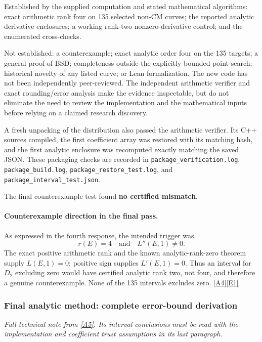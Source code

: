 \documentclass[11pt]{article}
\newcommand{\srcref}[1]{\hyperlink{source:#1}{[#1]}}
\begin{document}
Established by the supplied computation and stated mathematical algorithms: exact arithmetic rank four on 135 selected non-CM curves; the reported analytic derivative enclosures; a working rank-two nonzero-derivative control; and the enumerated cross-checks.

Not established: a counterexample; exact analytic order four on the 135 targets; a general proof of BSD; completeness outside the explicitly bounded point search; historical novelty of any listed curve; or Lean formalization. The new code has not been independently peer-reviewed. The independent arithmetic verifier and exact rounding/error analysis make the evidence inspectable, but do not eliminate the need to review the implementation and the mathematical inputs before relying on a claimed research discovery.

A fresh unpacking of the distribution also passed the arithmetic verifier. Its C++ sources compiled, the first coefficient array was restored with its matching hash, and the first analytic enclosure was recomputed exactly matching the saved JSON. These packaging checks are recorded in \nolinkurl{package_verification.log}, \nolinkurl{package_build.log}, \nolinkurl{package_restore_test.log}, and \nolinkurl{package_interval_test.json}.

The final counterexample test found \textbf{no certified mismatch}.

\paragraph{Counterexample direction in the final pass.}
As expressed in the fourth response, the intended trigger was
\[
 \boxed{r(E)=4\quad\text{and}\quad L''(E,1)\ne0.}
\]
The exact positive arithmetic rank and the known analytic-rank-zero theorem
supply $L(E,1)=0$; positive sign supplies $L'(E,1)=0$. Thus an interval for $D_2$
excluding zero would have certified analytic rank two, not four, and therefore
a genuine counterexample. None of the 135 intervals excludes zero.
\srcref{A4}\srcref{E1}

\subsubsection{Final analytic method: complete error-bound derivation}\label{interval-method}
\textit{Full technical note from \srcref{A5}. Its interval conclusions must be read with the implementation and coefficient trust assumptions in its last paragraph.}
\end{document}
